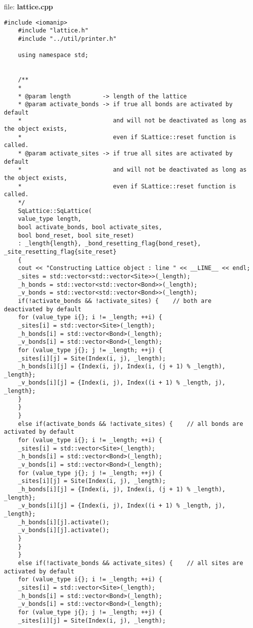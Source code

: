 	file: \textbf{lattice.cpp}
	\begin{lstlisting}[style=CStyle]
	#include <iomanip>
	#include "lattice.h"
	#include "../util/printer.h"
	
	using namespace std;
	
	
	/**
	*
	* @param length         -> length of the lattice
	* @param activate_bonds -> if true all bonds are activated by default
	*                          and will not be deactivated as long as the object exists,
	*                          even if SLattice::reset function is called.
	* @param activate_sites -> if true all sites are activated by default
	*                          and will not be deactivated as long as the object exists,
	*                          even if SLattice::reset function is called.
	*/
	SqLattice::SqLattice(
	value_type length,
	bool activate_bonds, bool activate_sites,
	bool bond_reset, bool site_reset)
	: _length{length}, _bond_resetting_flag{bond_reset}, _site_resetting_flag{site_reset}
	{
	cout << "Constructing Lattice object : line " << __LINE__ << endl;
	_sites = std::vector<std::vector<Site>>(_length);
	_h_bonds = std::vector<std::vector<Bond>>(_length);
	_v_bonds = std::vector<std::vector<Bond>>(_length);
	if(!activate_bonds && !activate_sites) {    // both are deactivated by default
	for (value_type i{}; i != _length; ++i) {
	_sites[i] = std::vector<Site>(_length);
	_h_bonds[i] = std::vector<Bond>(_length);
	_v_bonds[i] = std::vector<Bond>(_length);
	for (value_type j{}; j != _length; ++j) {
	_sites[i][j] = Site(Index(i, j), _length);
	_h_bonds[i][j] = {Index(i, j), Index(i, (j + 1) % _length), _length};
	_v_bonds[i][j] = {Index(i, j), Index((i + 1) % _length, j), _length};
	}
	}
	}
	else if(activate_bonds && !activate_sites) {    // all bonds are activated by default
	for (value_type i{}; i != _length; ++i) {
	_sites[i] = std::vector<Site>(_length);
	_h_bonds[i] = std::vector<Bond>(_length);
	_v_bonds[i] = std::vector<Bond>(_length);
	for (value_type j{}; j != _length; ++j) {
	_sites[i][j] = Site(Index(i, j), _length);
	_h_bonds[i][j] = {Index(i, j), Index(i, (j + 1) % _length), _length};
	_v_bonds[i][j] = {Index(i, j), Index((i + 1) % _length, j), _length};
	_h_bonds[i][j].activate();
	_v_bonds[i][j].activate();
	}
	}
	}
	else if(!activate_bonds && activate_sites) {    // all sites are activated by default
	for (value_type i{}; i != _length; ++i) {
	_sites[i] = std::vector<Site>(_length);
	_h_bonds[i] = std::vector<Bond>(_length);
	_v_bonds[i] = std::vector<Bond>(_length);
	for (value_type j{}; j != _length; ++j) {
	_sites[i][j] = Site(Index(i, j), _length);

\end{lstlisting}
